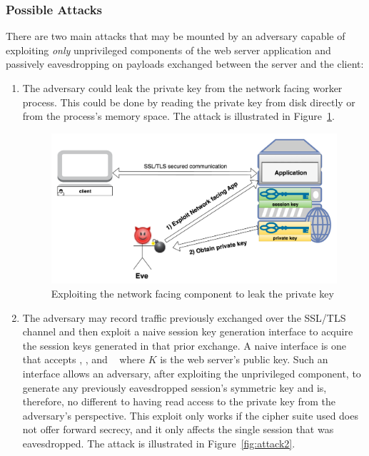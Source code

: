 \documentclass[../main.tex]{subfiles}
\begin{document}
\subsubsection*{Possible Attacks}

There are two main attacks that may be mounted by an adversary capable
of exploiting \textit{only} unprivileged components of the web
server application and passively eavesdropping on payloads exchanged
between the server and the client:
 
\begin{enumerate}
  \item The adversary could leak the private key from the network
    facing worker process. This could be done by reading the private key
    from disk directly or from the process's memory space. The attack is
    illustrated in Figure~\ref{fig:attack1}.

    \begin{figure}[H] \centering
      \includegraphics[scale=0.15]{images/attack1.png}
      \caption{Exploiting the network facing component to leak the
        private key}
      \label{fig:attack1}
    \end{figure}

  \item The adversary may record traffic previously exchanged over the SSL/TLS
    channel and then exploit a naive session key generation interface to
    acquire the session keys generated in that prior exchange. A naive interface is
    one that accepts \crandom, \srandom, and \premaster~ where $K$ is the
    web server's public key. Such an interface allows an adversary, after
    exploiting the unprivileged component, to generate any previously
    eavesdropped session's symmetric key and is, therefore, no different
    to having read access to the private key from the adversary's
    perspective. This exploit only works if the cipher suite used does not offer
    forward secrecy, and it only affects the single session that was
    eavesdropped. The attack is illustrated in Figure~\ref{fig:attack2}.


\end{enumerate}
\end{document}
